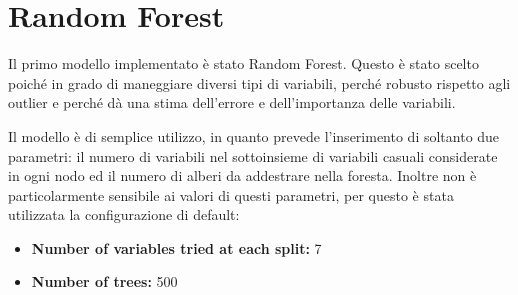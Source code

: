 \section{Random Forest}
Il primo modello implementato è stato Random Forest. Questo è stato scelto 
poiché in grado di maneggiare diversi tipi di variabili, perché robusto 
rispetto agli outlier e perché dà una stima dell'errore e dell'importanza delle 
variabili. 

Il modello è di semplice utilizzo, in quanto prevede l’inserimento di soltanto 
due parametri: il numero di variabili nel sottoinsieme di variabili casuali 
considerate in ogni nodo ed il numero di alberi da addestrare nella foresta. 
Inoltre non è particolarmente sensibile ai valori di questi parametri, per 
questo è stata utilizzata la configurazione di default:
\begin{itemize}
	\item \textbf{Number of variables tried at each split:} 7
	\item \textbf{Number of trees:} 500
\end{itemize}
